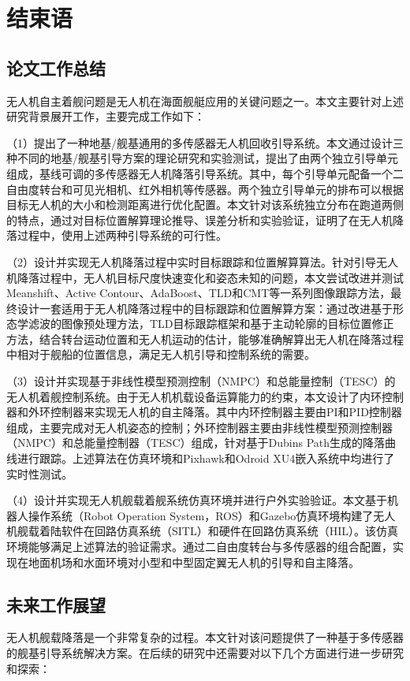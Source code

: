 \chapter{结束语}

\section{论文工作总结}
无人机自主着舰问题是无人机在海面舰艇应用的关键问题之一。本文主要针对上述研究背景展开工作，主要完成工作如下：

（1）提出了一种地基/舰基通用的多传感器无人机回收引导系统。本文通过设计三种不同的地基/舰基引导方案的理论研究和实验测试，提出了由两个独立引导单元组成，基线可调的多传感器无人机降落引导系统。其中，每个引导单元配备一个二自由度转台和可见光相机、红外相机等传感器。两个独立引导单元的排布可以根据目标无人机的大小和检测距离进行优化配置。本文针对该系统独立分布在跑道两侧的特点，通过对目标位置解算理论推导、误差分析和实验验证，证明了在无人机降落过程中，使用上述两种引导系统的可行性。

（2）设计并实现无人机降落过程中实时目标跟踪和位置解算算法。针对引导无人机降落过程中，无人机目标尺度快速变化和姿态未知的问题，本文尝试改进并测试Meanshift、Active Contour、AdaBoost、TLD和CMT等一系列图像跟踪方法，最终设计一套适用于无人机降落过程中的目标跟踪和位置解算方案：通过改进基于形态学滤波的图像预处理方法，TLD目标跟踪框架和基于主动轮廓的目标位置修正方法，结合转台运动位置和无人机运动的估计，能够准确解算出无人机在降落过程中相对于舰船的位置信息，满足无人机引导和控制系统的需要。

（3）设计并实现基于非线性模型预测控制（NMPC）和总能量控制（TESC）的无人机着舰控制系统。由于无人机机载设备运算能力的约束，本文设计了内环控制器和外环控制器来实现无人机的自主降落。其中内环控制器主要由PI和PID控制器组成，主要完成对无人机姿态的控制；外环控制器主要由非线性模型预测控制器（NMPC）和总能量控制器（TESC）组成，针对基于Dubins Path生成的降落曲线进行跟踪。上述算法在仿真环境和Pixhawk和Odroid XU4嵌入系统中均进行了实时性测试。

（4）设计并实现无人机舰载着舰系统仿真环境并进行户外实验验证。本文基于机器人操作系统（Robot Operation System，ROS）和Gazebo仿真环境构建了无人机舰载着陆软件在回路仿真系统（SITL）和硬件在回路仿真系统（HIL）。该仿真环境能够满足上述算法的验证需求。通过二自由度转台与多传感器的组合配置，实现在地面机场和水面环境对小型和中型固定翼无人机的引导和自主降落。

\section{未来工作展望}
无人机舰载降落是一个非常复杂的过程。本文针对该问题提供了一种基于多传感器的舰基引导系统解决方案。在后续的研究中还需要对以下几个方面进行进一步研究和探索：

